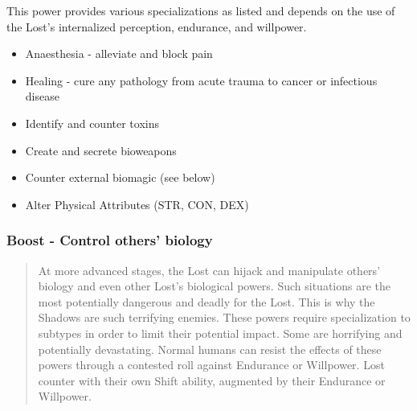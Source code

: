 \documentclass[letterpaper,serif]{rpg-module}
\begin{document}
This power provides various specializations as listed and depends on the use of the Lost's internalized perception, endurance, and willpower. 

    \begin{itemize}
	    \item Anaesthesia - alleviate and block pain
	    \item Healing - cure any pathology from acute trauma to cancer or infectious disease
    	\item Identify and counter toxins
	    \item Create and secrete bioweapons
	    \item Counter external biomagic (see below)
	    \item Alter Physical Attributes (STR, CON, DEX)
    \end{itemize}

\subsubsection{Boost - Control others' biology} 

\begin{quote}
At more advanced stages, the Lost can hijack and manipulate others' biology and even other Lost's biological powers. 
	Such situations are the most potentially dangerous and deadly for the Lost. 
	This is why the Shadows are such terrifying enemies. 
	These powers require specialization to subtypes in order to limit their potential impact. Some are horrifying and potentially devastating. Normal humans can resist the effects of these powers through a contested roll against Endurance or Willpower. Lost counter with their own Shift ability, augmented by their Endurance or Willpower.  
\end{quote}
\end{document}
